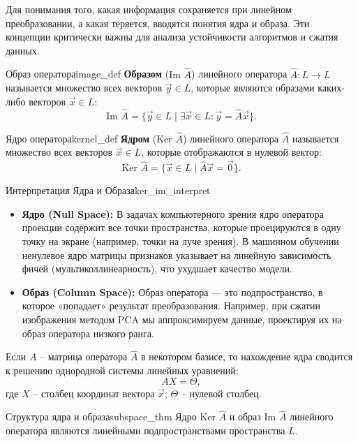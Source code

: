 \documentclass[12pt,a4paper]{article}
\begin{document}
Для понимания того, какая информация сохраняется при линейном
преобразовании, а какая теряется, вводятся понятия ядра и образа. Эти
концепции критически важны для анализа устойчивости алгоритмов и сжатия данных.

\begin{definition}{Образ оператора}{image_def}
  \textbf{Образом} ($\text{Im } \hat{A}$) линейного оператора
  $\hat{A}: L \to L$ называется множество всех векторов $\vec{y} \in
  L$, которые являются образами каких-либо векторов $\vec{x} \in L$:
  \[
    \text{Im } \hat{A} = \{ \vec{y} \in L \mid \exists \vec{x} \in L
    : \vec{y} = \hat{A}\vec{x} \}.
  \]
\end{definition}

\begin{definition}{Ядро оператора}{kernel_def}
  \textbf{Ядром} ($\text{Ker } \hat{A}$) линейного оператора
  $\hat{A}$ называется множество всех векторов $\vec{x} \in L$,
  которые отображаются в нулевой вектор:
  \[
    \text{Ker } \hat{A} = \{ \vec{x} \in L \mid \hat{A}\vec{x} = \vec{0} \}.
  \]
\end{definition}

\begin{remarkIT}{Интерпретация Ядра и Образа}{ker_im_interpret}
  \begin{itemize}
    \item \textbf{Ядро (Null Space):} В задачах компьютерного зрения
      ядро оператора проекции содержит все точки пространства,
      которые проецируются в одну точку на экране (например, точки на
      луче зрения). В машинном обучении ненулевое ядро матрицы
      признаков указывает на линейную зависимость фичей
      (мультиколлинеарность), что ухудшает качество модели.
    \item \textbf{Образ (Column Space):} Образ оператора — это
      подпространство, в которое «попадает» результат преобразования.
      Например, при сжатии изображения методом PCA мы аппроксимируем
      данные, проектируя их на образ оператора низкого ранга.
  \end{itemize}
\end{remarkIT}

Если $A$ -- матрица оператора $\hat{A}$ в некотором базисе, то
нахождение ядра сводится к решению однородной системы линейных уравнений:
\[
  A X = \Theta,
\]
где $X$ -- столбец координат вектора $\vec{x}$, $\Theta$ -- нулевой столбец.

\begin{theorem}{Структура ядра и образа}{subspace_thm}
  Ядро $\text{Ker } \hat{A}$ и образ $\text{Im } \hat{A}$ линейного
  оператора являются линейными подпространствами пространства $L$.
\end{theorem}
\end{document}
